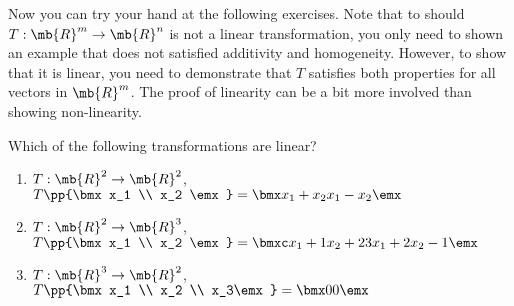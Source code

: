 Now you can try your hand at the following exercises. Note that to should $T: \mb{R}^m \to \mb{R}^n$ is not a linear transformation, you only need to shown an example that does not satisfied additivity and homogeneity. However, to show that it is linear, you need to demonstrate that $T$ satisfies both properties for all vectors in $\mb{R}^m$. The proof of linearity can be a bit more involved than showing non-linearity.
\begin{boxedstuff}
\begin{problem}
Which of the following transformations are linear?
\begin{enumerate}
    \item $T: \mb{R}^2 \to \mb{R}^2$, $T\pp{\bmx x_1 \\ x_2 \emx} = \bmx x_1 + x_2 \\ x_1 - x_2 \emx$
    \item $T: \mb{R}^2 \to \mb{R}^3$, $T\pp{\bmx x_1 \\ x_2 \emx} = \bmxc x_1 + 1 \\ x_2 + 2 \\ 3x_1 + 2x_2 - 1\emx$
    \item $T: \mb{R}^3 \to \mb{R}^2$, $T\pp{\bmx x_1 \\ x_2 \\ x_3\emx} = \bmx 0 \\ 0 \emx$
\end{enumerate}
\end{problem}

\end{boxedstuff}

